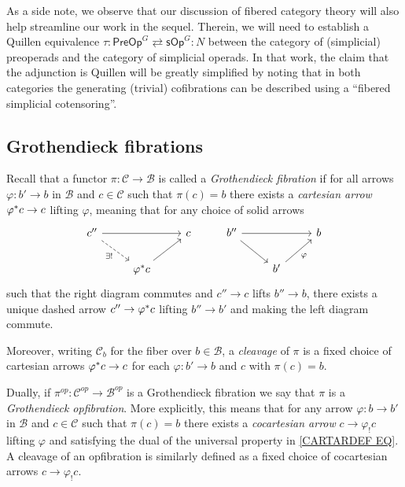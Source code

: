 \documentclass[a4paper,10pt
,draft
]{article}%
\numberwithin{equation}{section}
\numberwithin{figure}{section}
\theoremstyle{definition} %
\newcommand{\1}{\ensuremath{\mathbbm 1}}%
\begin{document}
As a side note, we observe that our discussion of fibered category theory will also help streamline our work in the sequel.
Therein, we will need to establish a Quillen equivalence
$\tau \colon \mathsf{PreOp}^G \rightleftarrows \mathsf{sOp}^G\colon N$
between the category of (simplicial) preoperads and
the category of simplicial operads.
In that work, the claim that the adjunction is Quillen 
will be greatly simplified by noting that in both categories 
the generating (trivial) cofibrations
can be described using a ``fibered simplicial cotensoring''.





\subsection{Grothendieck fibrations}\label{GROTFIB SEC}


Recall that a functor 
$\pi \colon \mathcal{C} \to \mathcal{B}$
is called a \emph{Grothendieck fibration}
if for all arrows
$\varphi \colon b' \to b$ in $\mathcal{B}$
and $c \in \mathcal{C}$ such that $\pi(c) = b$
there exists a \emph{cartesian arrow}
$\varphi^{\**}c \to c$
lifting $\varphi$,
meaning that for any choice of solid arrows
\begin{equation}\label{CARTARDEF EQ}
\begin{tikzcd}
c'' \ar{rr} \ar[dashed]{rd}[swap]{\exists!} 
&&
c
&%
b'' \ar{rr} \ar{rd} 
&&
b
\\
& \varphi^{\**} c \ar{ru}
&
&%
& b'\ar{ru}[swap]{\varphi}
&
\end{tikzcd}
\end{equation}
such that the right diagram commutes and 
$c'' \to c$ lifts $b'' \to b$,
there exists a unique dashed arrow
$c'' \to \varphi^{\**} c$ lifting $b'' \to b'$
and making the left diagram commute.


Moreover, writing $\mathcal{C}_b$ for the fiber over $b \in \mathcal{B}$,
a \emph{cleavage} of $\pi$ is a fixed choice of cartesian arrows
$\varphi^{\**} c \to c$
for each $\varphi \colon b' \to b$ and $c$ with $\pi(c)=b$.


Dually, if $\pi^{op} \colon \mathcal{C}^{op} \to \mathcal{B}^{op}$
is a Grothendieck fibration we 
say that $\pi$ is a \emph{Grothendieck opfibration}.
More explicitly, this means that for any arrow
$\varphi \colon b \to b'$ in $\mathcal{B}$
and $c \in \mathcal{C}$ such that 
$\pi(c) = b$ there exists a 
\emph{cocartesian arrow}
$c \to \varphi_! c$ lifting $\varphi$
and satisfying the dual of the universal property in 
\eqref{CARTARDEF EQ}.
A cleavage of an opfibration is similarly defined as a fixed choice
of cocartesian arrows 
$c \to \varphi_!c$.
\end{document}
